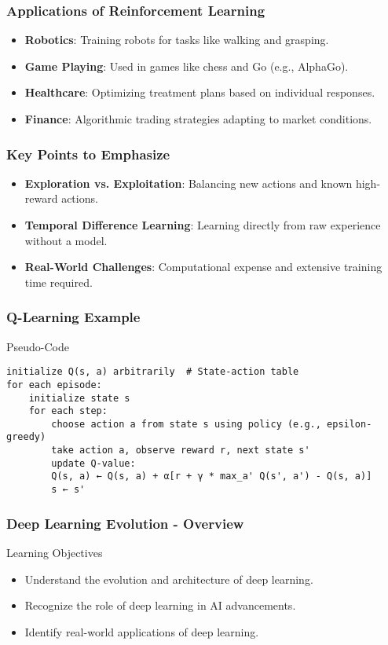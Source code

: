 \documentclass[aspectratio=169]{beamer}
\begin{document}
\begin{frame}[fragile]
    \frametitle{Applications of Reinforcement Learning}
    \begin{itemize}
        \item \textbf{Robotics}: Training robots for tasks like walking and grasping.
        \item \textbf{Game Playing}: Used in games like chess and Go (e.g., AlphaGo).
        \item \textbf{Healthcare}: Optimizing treatment plans based on individual responses.
        \item \textbf{Finance}: Algorithmic trading strategies adapting to market conditions.
    \end{itemize}
\end{frame}

\begin{frame}[fragile]
    \frametitle{Key Points to Emphasize}
    \begin{itemize}
        \item \textbf{Exploration vs. Exploitation}: Balancing new actions and known high-reward actions.
        \item \textbf{Temporal Difference Learning}: Learning directly from raw experience without a model.
        \item \textbf{Real-World Challenges}: Computational expense and extensive training time required.
    \end{itemize}
\end{frame}

\begin{frame}[fragile]
    \frametitle{Q-Learning Example}
    \begin{block}{Pseudo-Code}
    \begin{lstlisting}
initialize Q(s, a) arbitrarily  # State-action table
for each episode:
    initialize state s
    for each step:
        choose action a from state s using policy (e.g., epsilon-greedy)
        take action a, observe reward r, next state s'
        update Q-value:
        Q(s, a) ← Q(s, a) + α[r + γ * max_a' Q(s', a') - Q(s, a)]
        s ← s'
    \end{lstlisting}
    \end{block}
\end{frame}

\begin{frame}[fragile]
    \frametitle{Deep Learning Evolution - Overview}
    \begin{block}{Learning Objectives}
        \begin{itemize}
            \item Understand the evolution and architecture of deep learning.
            \item Recognize the role of deep learning in AI advancements.
            \item Identify real-world applications of deep learning.
        \end{itemize}
    \end{block}
\end{frame}
\end{document}
